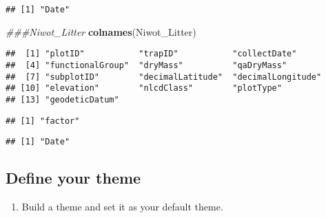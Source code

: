 \documentclass[]{article}
\newenvironment{Shaded}{\begin{snugshade}}{\end{snugshade}}
\newcommand{\CommentTok}[1]{\textcolor[rgb]{0.56,0.35,0.01}{\textit{#1}}}
\newcommand{\DataTypeTok}[1]{\textcolor[rgb]{0.13,0.29,0.53}{#1}}
\newcommand{\KeywordTok}[1]{\textcolor[rgb]{0.13,0.29,0.53}{\textbf{#1}}}
\newcommand{\NormalTok}[1]{#1}
\newcommand{\OperatorTok}[1]{\textcolor[rgb]{0.81,0.36,0.00}{\textbf{#1}}}
\newcommand{\StringTok}[1]{\textcolor[rgb]{0.31,0.60,0.02}{#1}}
\providecommand{\tightlist}{%
  \setlength{\itemsep}{0pt}\setlength{\parskip}{0pt}}
\begin{document}
\begin{verbatim}
## [1] "Date"
\end{verbatim}

\begin{Shaded}
\begin{Highlighting}[]
\CommentTok{###Niwot_Litter}
\KeywordTok{colnames}\NormalTok{(Niwot_Litter)}
\end{Highlighting}
\end{Shaded}

\begin{verbatim}
##  [1] "plotID"           "trapID"           "collectDate"     
##  [4] "functionalGroup"  "dryMass"          "qaDryMass"       
##  [7] "subplotID"        "decimalLatitude"  "decimalLongitude"
## [10] "elevation"        "nlcdClass"        "plotType"        
## [13] "geodeticDatum"
\end{verbatim}

\begin{Shaded}
\end{Shaded}

\begin{verbatim}
## [1] "factor"
\end{verbatim}

\begin{Shaded}
\end{Shaded}

\begin{verbatim}
## [1] "Date"
\end{verbatim}

\hypertarget{define-your-theme}{%
\subsection{Define your theme}\label{define-your-theme}}

\begin{enumerate}
\def\labelenumi{\arabic{enumi}.}
\setcounter{enumi}{2}
\tightlist
\item
  Build a theme and set it as your default theme.
\end{enumerate}
\end{document}
